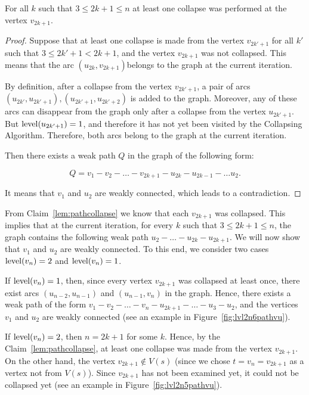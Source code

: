 \begin{claim}
\label{lem:pathcollapse}
For all $ k $ such that $ 3 \le 2k + 1 \le n $ at least one collapse was performed at the vertex $ v_{2k + 1} $.
\end{claim}
\begin{proof}
Suppose that at least one collapse is made from the vertex $ v_{2k '+ 1} $ for all $ k' $ such that $ 3 \le 2k '+ 1 <2k + 1 $, and the vertex $ v_{2k + 1} $ was not collapsed. This means that the arc $ (u_{2k}, v_{2k + 1}) $belongs to the graph at the current iteration.

By definition, after a collapse from the vertex $ v_{2k '+ 1} $, a pair of arcs $ (u_{2k'}, u_{2k '+ 1}), (u_{2k' + 1}, u_{2k '+ 2}) $ is added to the graph. Moreover, any of these arcs can disappear from the graph only after a collapse from the vertex $ u_ {2k '+ 1} $. But $\operatorname{level}(u_ {2k '+ 1})= 1 $, and therefore it has not yet been visited by the Collapsing Algorithm. Therefore, both arcs belong to the graph at the current iteration.

Then there exists a weak path $ Q $ in the graph of the following form:

$$
Q = v_1 - v_2 - \ldots - v_{2k+1} - u_{2k} - u_{2k-1} - \ldots u_2.
$$

It means that $v_1$ and $u_2$ are weakly connected, which leads to a contradiction.
\end{proof}

From Claim~\ref{lem:pathcollapse} we know that each $v_{2k+1}$ was collapsed. This implies that at the current iteration, for every $k$ such that $3\le 2k+1\le n$, the graph contains the following weak path $ u_2 - \ldots - u_{2k} - u_{2k + 1} $. We will now show that $v_1$ and $u_2$ are weakly connected. To this end, we consider two cases $ \operatorname{level} (v_{n}) = 2 $ and $ \operatorname{level} (v_{n}) = 1 $. 

If $ \operatorname{level} (v_{n}) = 1 $, then, since every vertex $ v_{2k + 1} $ was collapsed at least once, there exist arcs $(u_{n-2},u_{n-1} ) $ and $ (u_{n-1}, v_n) $ in the graph. Hence, there exists a weak path of the form $ v_1 - v_2 - \ldots - v_n - u_{2k + 1} - \ldots - u_3 - u_2 $, and the vertices $ v_1 $ and $ u_2 $ are weakly connected (see an example in Figure~\ref{fig:lvl2n6pathvu}).

If $ \operatorname{level} (v_{n}) = 2 $, then $ n = 2k + 1 $ for some $ k $. Hence, by the Claim~\ref{lem:pathcollapse}, at least one collapse was made from the vertex $ v_{2k + 1} $. On the other hand, the vertex $ v_{2k + 1} \notin V (s) $ (since we chose $t=v_n=v_{2k+1}$ as a vertex not from $V(s)$). Since $v_{2k+1}$ has not been examined yet, it could not be collapsed yet (see an example in Figure~\ref{fig:lvl2n5pathvu}).

